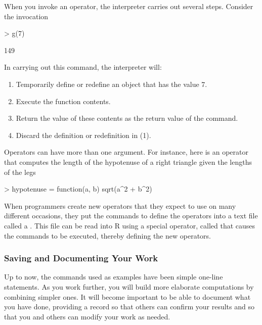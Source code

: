 When you invoke an operator, the interpreter carries out several
steps.  Consider the invocation
\begin{Schunk}
\begin{Sinput}
> g(7)
\end{Sinput}
\begin{Soutput}
[1] 149
\end{Soutput}
\end{Schunk}
In carrying out this command, the interpreter will:
\begin{enumerate}
\item Temporarily define or redefine an object  that has
  the value 7.
\item Execute the function contents.
\item Return the value of these contents as the return value of the
  command.
\item Discard the definition or redefinition in (1).
\end{enumerate}

Operators can have more than one argument.  For instance, here is an
operator  that computes the length of the hypotenuse
of a right triangle given the lengths of the legs
\begin{Schunk}
\begin{Sinput}
> hypotenuse = function(a, b) {
     sqrt(a^2 + b^2)
 }
\end{Sinput}
\end{Schunk}

When programmers create new operators that they expect to use on many
different occasions, they put the commands
to define the operators into a text file called a 
.  
This file can be read into R using a special operator, called
 that causes the commands to be executed, thereby
defining the new operators.

\subsubsection{Saving and Documenting Your Work}


Up to now, the commands used as examples have been simple one-line
statements.  As you work further, you will build more elaborate
computations by combining simpler ones.  It will become important to
be able to document what you have done, providing a record so that
others can confirm your results and so that you and others can modify
your work as needed.

